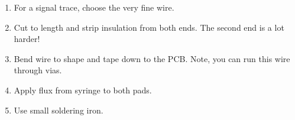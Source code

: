 \begin{enumerate}
\item For a signal trace, choose the very fine wire.

\item Cut to length and strip insulation from both ends.  The second
  end is a lot harder!

\item Bend wire to shape and tape down to the PCB.  Note, you can run
  this wire through vias.

\item Apply flux from syringe to both pads.

\item Use small soldering iron.  
\end{enumerate}
